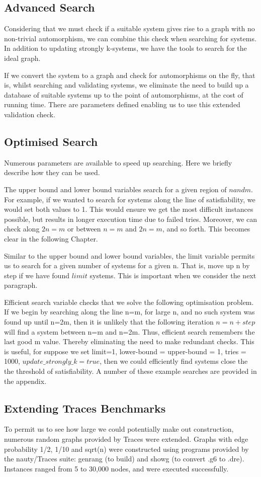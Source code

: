 \subsection{Advanced Search}
Considering that we must check if a suitable system gives rise to a graph with no non-trivial automorphism, we can combine this check when searching for systems. In addition to updating strongly k-systems, we have the tools to search for the ideal graph.
\par
If we convert the system to a graph and check for automorphisms on the fly, that is, whilst searching and validating systems, we eliminate the need to build up a database of suitable systems up to the point of automorphisms, at the cost of running time. There are parameters defined enabling us to use this extended validation check.

\subsection{Optimised Search}
Numerous parameters are available to speed up searching. Here we briefly describe how they can be used.
\par
The upper bound and lower bound variables search for a given region of $n and m$. For example, if we wanted to search for systems along the line of satisfiability, we would set both values to 1. This would ensure we get the most difficult instances possible, but results in longer execution time due to failed tries. Moreover, we can check along $2n=m$ or between $n=m$ and $2n=m$, and so forth. This becomes clear in the following Chapter.
\par
Similar to the upper bound and lower bound variables, the limit variable permits us to search for a given number of systems for a given n. That is, move up n by step if we have found $limit$ systems. This is important when we consider the next paragraph.
\par
Efficient search variable checks that we solve the following optimisation problem. If we begin by searching along the line n=m, for large n, and no such system was found up until n=2m, then it is unlikely that the following iteration $n=n+step$ will find a system between n=m and n=2m. Thus, efficient search remembers the last good m value. Thereby eliminating the need to make redundant checks. This is useful, for suppose we set limit=1, lower-bound = upper-bound = 1, tries = 1000, $update\_strongly\_k = true$, then we could efficiently find systems close the the threshold of satisfiability. A number of these example searches are provided in the appendix. 
 \newpage
\subsection{Extending Traces Benchmarks}
To permit us to see how large we could potentially make out construction, numerous random graphs provided by Traces were extended. Graphs with edge probability 1/2, 1/10 and sqrt(n) were constructed using programs provided by the nauty/Traces suite: genrang (to build) and showg (to convert .g6 to .dre). Instances ranged from 5 to 30,000 nodes, and were executed successfully.
